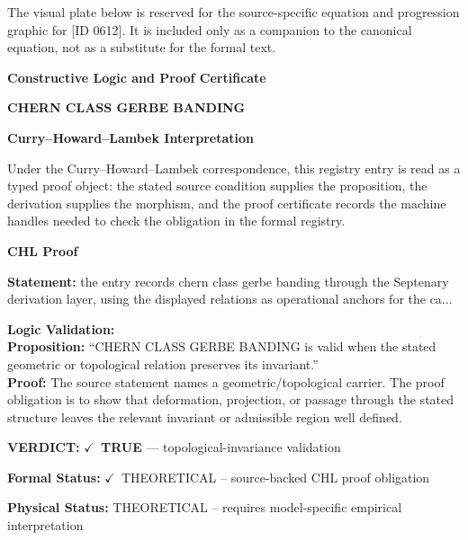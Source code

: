 \begingroup\footnotesize\sloppy
The visual plate below is reserved for the source-specific equation and progression graphic for [ID 0612]. It is included only as a companion to the canonical equation, not as a substitute for the formal text.
\par\endgroup
\ifTZPDarkEdition
{}
\fi

\clearpage
\begingroup\tzpsupportsetup
\noindent\textbf{\fontsize{10.8pt}{12.8pt}\selectfont [ID 0612] Constructive Logic and Proof Certificate}\par
\noindent\textbf{\fontsize{10pt}{12pt}\selectfont CHERN CLASS GERBE BANDING}\par
\vspace{0.45em}
\begingroup
\footnotesize
\setlength{\parskip}{0.22em}
\setlength{\parindent}{0pt}
\noindent\textbf{Curry--Howard--Lambek Interpretation}\par
Under the Curry--Howard--Lambek correspondence, this registry entry is read as a typed proof
object: the stated source condition supplies the proposition, the derivation supplies the
morphism, and the proof certificate records the machine handles needed to check the obligation
in the formal registry.

\vspace{0.45em}
\noindent\textbf{CHL Proof}\par
\textbf{Statement:} the entry records chern class gerbe banding through the Septenary derivation layer,
using the displayed relations as operational anchors for the ca...

\textbf{Logic Validation:}\\
\textbf{Proposition:} ``CHERN CLASS GERBE BANDING is valid when the stated geometric or topological relation
preserves its invariant.''\\
\textbf{Proof:} The source statement names a geometric/topological carrier. The proof obligation is to
show that deformation, projection, or passage through the stated structure leaves the
relevant invariant or admissible region well defined.

\textbf{VERDICT:} \ensuremath{\checkmark}\ \textbf{TRUE} --- topological-invariance validation

\textbf{Formal Status:} \ensuremath{\checkmark}\ THEORETICAL -- source-backed CHL proof obligation

\textbf{Physical Status:} THEORETICAL -- requires model-specific empirical interpretation
\par\vspace{0.45em}
\par
\ifTZPDarkEdition
{}
\fi
\endgroup
\endgroup
